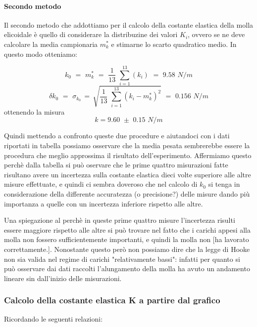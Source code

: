 \paragraph{Secondo metodo\\}
Il secondo metodo che addottiamo per il calcolo della costante elastica della molla elicoidale è quello di considerare la distribuzine dei valori $K_i$, ovvero se ne deve calcolare la media campionaria $m^*_k$ e stimarne lo scarto quadratico medio. In questo modo otteniamo:

\begin{equation*}
	k_0 \,\,=\,\, m^*_k \,\,=\,\, \frac{1}{13}\,\,\sum_{i=1}^{13} (k_i) \,\,=\,\, 9.58 \,\,N/m
\end{equation*}
\begin{equation*}
	\delta k_0 \,\,=\,\, \sigma_{k_0} \,=\, \sqrt{\frac{1}{13}\,\,\sum_{i=1}^{13} (k_i - m^*_k)^2} \,\,=\,\, 0.156 \,\,N/m
\end{equation*}
ottenendo la misura
\begin{equation}
		k = 9.60 \,\, \pm \,\, 0.15 \,\, N/m
\end{equation}

Quindi mettendo a confronto queste due procedure e aiutandoci con i dati riportati in tabella possiamo osservare che la media pesata sembrerebbe essere la procedura che meglio approssima il risultato dell'esperimento. Affermiamo questo perchè dalla tabella si può oservare che le prime quattro misurazioni fatte risultano avere un incertezza sulla costante elastica dieci volte superiore alle altre misure effettuate, e quindi ci sembra doveroso che nel calcolo di $k_0$ si tenga in considerazione della differente accuratezza (o precisione?) delle misure dando più importanza a quelle con un incertezza inferiore rispetto alle altre.

Una spiegazione al perchè in queste prime quattro misure l'incertezza risulti essere maggiore rispetto alle altre si può trovare nel fatto che i carichi appesi alla molla non fossero sufficientemente importanti, e quindi la molla non [ha lavorato correttamente.]. Nonostante questo però non possiamo dire che la legge di Hooke non sia valida nel regime di carichi "relativamente bassi": infatti per quanto si può osservare dai dati raccolti l'alungamento della molla ha avuto un andamento lineare sin dall'inizio delle misurazioni.

\subsubsection{Calcolo della costante elastica K a partire dal grafico}
Ricordando le seguenti relazioni:

